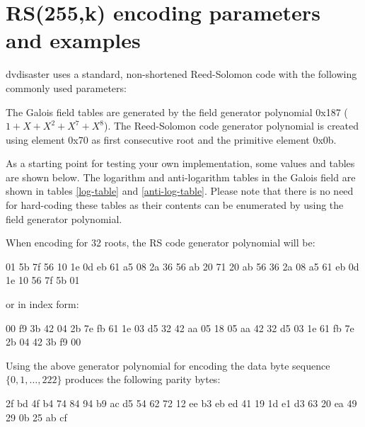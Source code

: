 \newpage
\section{RS(255,k) encoding parameters and examples}
\label{rs}

dvdisaster uses a standard, non-shortened Reed-Solomon code
with the following commonly used parameters: \smallskip

The Galois field tables are generated by the field
generator polynomial 0x187 ($1 + X + X^2 + X^7 + X^8$).
The Reed-Solomon code generator polynomial is created using element 
0x70 as first consecutive root and the primitive element 0x0b. \medskip

As a starting point for testing your own implementation, some 
values and tables are shown below. The logarithm
and anti-logarithm tables in the Galois field are shown in tables
\ref{log-table} and \ref{anti-log-table}. Please note that there is no need for hard-coding
these tables as their contents can be enumerated by using
the field generator polynomial. \medskip

When encoding for 32 roots, the RS code generator polynomial will be:

{\small 01 5b 7f 56 10 1e 0d eb 61 a5 08 2a 36 56 ab 20 71 20 ab 56 36 2a 08 a5 61 eb 0d 1e 10 56 7f 5b 01}

or in index form:

{\small 00 f9 3b 42 04 2b 7e fb 61 1e 03 d5 32 42 aa 05 18 05 aa 42 32 d5 03 1e 61 fb 7e 2b 04 42 3b f9 00} \medskip

Using the above generator polynomial for encoding the data byte
sequence $\{0,1,\ldots,222\}$ produces the following parity bytes:

{\small 2f bd 4f b4 74 84 94 b9 ac d5 54 62 72 12 ee b3 eb ed 41 19 1d e1 d3 63 20 ea 49 29 0b 25 ab cf}

\newpage

